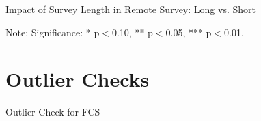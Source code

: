 \documentclass[11pt,harvard]{article}
\begin{document}
\begin{table}[htbp]
	\centering
	\begin{adjustbox}{max width=\textwidth}
		\begin{threeparttable}
			\caption{Impact of Survey Length in Remote Survey: Long vs. Short}
			\scriptsize
			 
			\label{tab:Ecuador_Outcome_RM_Length_Balance}
			\begin{tablenotes}
				\item Note: Significance: * p$<$0.10, ** p$<$0.05, *** p$<$0.01. 
			\end{tablenotes}
		\end{threeparttable}
	\end{adjustbox}
\end{table}

\pagebreak
	
\section{Outlier Checks}
	
\begin{table}[htbp]
	\centering
	\begin{adjustbox}{max width=\textwidth}
		\begin{threeparttable}
			\caption{Outlier Check for FCS}
			\scriptsize
			 
			\label{tab:Summary_Stats_Outlier}
		\end{threeparttable}
	\end{adjustbox}
\end{table}
	
\end{document}
